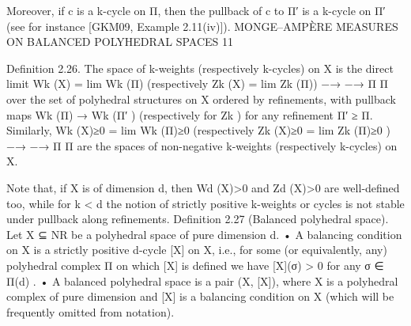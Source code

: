 \documentclass[
  11pt,
]{article}
\newenvironment{Shaded}{}{}
\newcommand{\NormalTok}[1]{#1}
\begin{document}
\begin{Shaded}
\begin{Highlighting}[]
\NormalTok{  Moreover, if c is a k{-}cycle on Π, then the pullback of c to Π′ is a k{-}cycle on Π′ (see for instance}
\NormalTok{[GKM09, Example 2.11(iv)]).}
\NormalTok{                  MONGE–AMPÈRE MEASURES ON BALANCED POLYHEDRAL SPACES                            11}


\NormalTok{Definition 2.26. The space of k{-}weights (respectively k{-}cycles) on X is the direct limit}
\NormalTok{                     Wk (X) = lim Wk (Π)     (respectively    Zk (X) = lim Zk (Π))}
\NormalTok{                              −→                                       −→}
\NormalTok{                                  Π                                     Π}
\NormalTok{over the set of polyhedral structures on X ordered by refinements, with pullback maps Wk (Π) →}
\NormalTok{Wk (Π′ ) (respectively for Zk ) for any refinement Π′ ≥ Π.}
\NormalTok{   Similarly,}
\NormalTok{                Wk (X)≥0 = lim Wk (Π)≥0      (respectively    Zk (X)≥0 = lim Zk (Π)≥0 )}
\NormalTok{                           −→                                            −→}
\NormalTok{                              Π                                             Π}
\NormalTok{are the spaces of non{-}negative k{-}weights (respectively k{-}cycles) on X.}

\NormalTok{    Note that, if X is of dimension d, then Wd (X)\textgreater{}0 and Zd (X)\textgreater{}0 are well{-}defined too, while}
\NormalTok{for k \textless{} d the notion of strictly positive k{-}weights or cycles is not stable under pullback along}
\NormalTok{refinements.}
\NormalTok{Definition 2.27 (Balanced polyhedral space). Let X ⊆ NR be a polyhedral space of pure}
\NormalTok{dimension d.}
\NormalTok{     • A balancing condition on X is a strictly positive d{-}cycle [X] on X, i.e., for some (or}
\NormalTok{       equivalently, any) polyhedral complex Π on which [X] is defined we have [X](σ) \textgreater{} 0 for any}
\NormalTok{       σ ∈ Π(d) .}
\NormalTok{     • A balanced polyhedral space is a pair (X, [X]), where X is a polyhedral complex of pure}
\NormalTok{       dimension and [X] is a balancing condition on X (which will be frequently omitted from}
\NormalTok{       notation).}


\end{Highlighting}
\end{Shaded}
\end{document}
